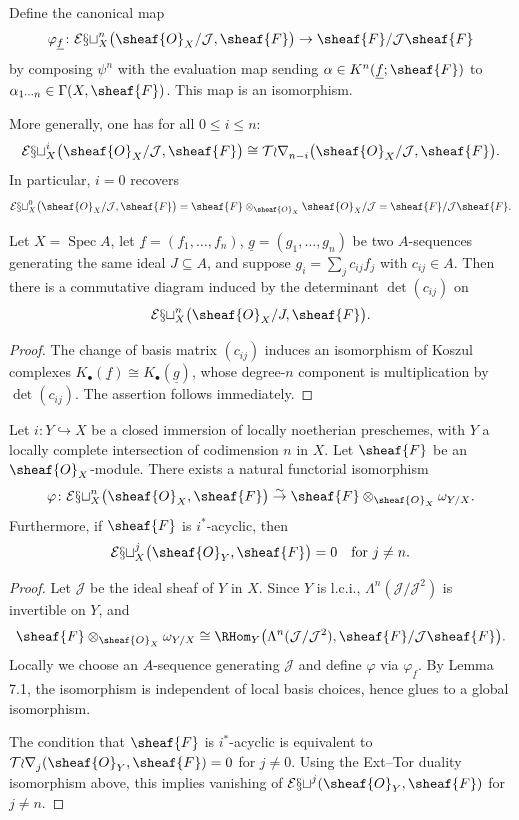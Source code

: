 Define the canonical map
\[
\varphi_{\underline{f}}\colon
\mathcal{Ext}_{X}^{n}\bigl(\sheaf{O}_X/\mathcal{J},\sheaf{F}\bigr)
\to \sheaf{F}/\mathcal{J}\sheaf{F}
\]
by composing \(\psi^n\) with the evaluation map sending \(\alpha\in K^n(\underline{f};\sheaf{F})\) to \(\alpha_{1\cdots n}\in\Gamma(X,\sheaf{F})\).
This map is an isomorphism.

More generally, one has for all \(0\le i\le n\):
\[
\mathcal{Ext}_{X}^{i}\bigl(\sheaf{O}_X/\mathcal{J},\sheaf{F}\bigr)
\cong \mathcal{Tor}_{n-i}\bigl(\sheaf{O}_X/\mathcal{J},\sheaf{F}\bigr).
\]
In particular, \(i=0\) recovers
\[
\mathcal{Ext}_{X}^{0}\bigl(\sheaf{O}_X/\mathcal{J},\sheaf{F}\bigr)
=\sheaf{F}\otimes_{\sheaf{O}_X}\sheaf{O}_X/\mathcal{J}
=\sheaf{F}/\mathcal{J}\sheaf{F}.
\]

\setcounter{page}{179}
\begin{lemma}
Let \(X=\operatorname{Spec}A\), let \(\underline{f}=(f_1,\dots,f_n)\), \(\underline{g}=(g_1,\dots,g_n)\) be two \(A\)-sequences generating the same ideal \(J\subseteq A\), and suppose \(g_i=\sum_j c_{ij}f_j\) with \(c_{ij}\in A\).
Then there is a commutative diagram induced by the determinant \(\det(c_{ij})\) on
\[
\mathcal{Ext}_{X}^{n}\bigl(\sheaf{O}_X/J,\sheaf{F}\bigr).
\]
\end{lemma}
\begin{proof}
The change of basis matrix \((c_{ij})\) induces an isomorphism of Koszul complexes \(K_\bullet(\underline{f})\cong K_\bullet(\underline{g})\), whose degree-\(n\) component is multiplication by \(\det(c_{ij})\). The assertion follows immediately.
\end{proof}

\setcounter{page}{180}
\begin{proposition}
Let \(i\colon Y \hookrightarrow X\) be a closed immersion of locally noetherian preschemes, with \(Y\) a locally complete intersection of codimension \(n\) in \(X\). Let \(\sheaf{F}\) be an \(\sheaf{O}_X\)-module.
There exists a natural functorial isomorphism
\[
\varphi\colon
\mathcal{Ext}_{X}^{n}\bigl(\sheaf{O}_X,\sheaf{F}\bigr)
\stackrel{\sim}{\to} \sheaf{F}\otimes_{\sheaf{O}_X}\omega_{Y/X}.
\]
Furthermore, if \(\sheaf{F}\) is \(i^*\)-acyclic, then
\[
\mathcal{Ext}_{X}^{j}\bigl(\sheaf{O}_Y,\sheaf{F}\bigr)=0 \quad \text{for } j\neq n.
\]
\end{proposition}
\begin{proof}
Let \(\mathcal{J}\) be the ideal sheaf of \(Y\) in \(X\). Since \(Y\) is l.c.i., \(\Lambda^n(\mathcal{J}/\mathcal{J}^2)\) is invertible on \(Y\), and
\[
\sheaf{F}\otimes_{\sheaf{O}_X}\omega_{Y/X}
\cong \RHom_Y\bigl(\Lambda^n(\mathcal{J}/\mathcal{J}^2),\sheaf{F}/\mathcal{J}\sheaf{F}\bigr).
\]
Locally we choose an \(A\)-sequence generating \(\mathcal{J}\) and define \(\varphi\) via \(\varphi_{\underline{f}}\). By Lemma 7.1, the isomorphism is independent of local basis choices, hence glues to a global isomorphism.

The condition that \(\sheaf{F}\) is \(i^*\)-acyclic is equivalent to \(\mathcal{Tor}_j(\sheaf{O}_Y,\sheaf{F})=0\) for \(j\neq0\). Using the Ext–Tor duality isomorphism above, this implies vanishing of \(\mathcal{Ext}^j(\sheaf{O}_Y,\sheaf{F})\) for \(j\neq n\).
\end{proof}

